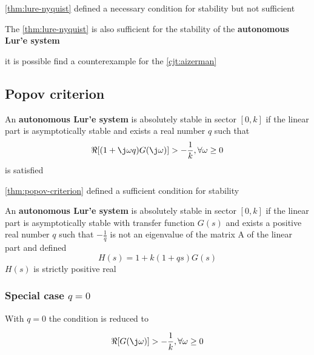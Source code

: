 \begin{nb}\cref{thm:lure-nyquist} defined a necessary condition for stability but not sufficient\end{nb}

\begin{conjecture}\label{cjt:aizerman}
    The \cref{thm:lure-nyquist} is also sufficient for the stability of the \textbf{autonomous Lur'e system}
\end{conjecture}

\begin{nb}
    it is possible find a counterexample for the \cref{cjt:aizerman}
\end{nb}

\subsection{Popov criterion}

\begin{theorem}\label{thm:popov-criterion}
    An \textbf{autonomous Lur'e system} is absolutely stable in sector $[0,k]$ if the linear part is asymptotically stable and exists a real number $q$ such that
    \[
        \Re [(1+\j \omega q) G(\j \omega)] > - \frac{1}{k}, \forall \omega \geq 0
    \]
    is satisfied
\end{theorem}

\begin{nb}\cref{thm:popov-criterion} defined a sufficient condition for stability\end{nb}

\begin{theorem}
    An \textbf{autonomous Lur'e system} is absolutely stable in sector $[0,k]$ if the linear part is asymptotically stable with transfer function $G(s)$ and exists a positive real number $q$ such that $-\frac{1}{q}$ is not an eigenvalue of the matrix A of the linear part and defined
    \[
        H(s) = 1+k(1+qs)G(s)
    \]
    $H(s)$ is strictly positive real
\end{theorem}

\subsubsection{Special case $q=0$}

With $q=0$ the condition is reduced to

\[
    \Re [G(\j \omega)] > - \frac{1}{k}, \forall \omega \geq 0
\]

